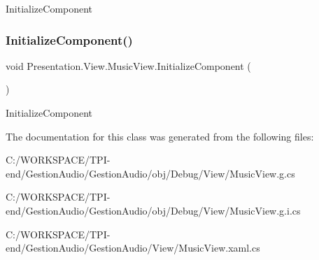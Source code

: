 Initialize\+Component 

\mbox{\label{class_presentation_1_1_view_1_1_music_view_ad544f1791f3fd9b81adde25bbc9a90cf}} 
\subsubsection{\texorpdfstring{Initialize\+Component()}{InitializeComponent()}\hspace{0.1cm}{\footnotesize\ttfamily [4/4]}}
{\footnotesize\ttfamily void Presentation.\+View.\+Music\+View.\+Initialize\+Component (\begin{DoxyParamCaption}{ }\end{DoxyParamCaption})}



Initialize\+Component 



The documentation for this class was generated from the following files\+:\begin{DoxyCompactItemize}
\item 
C\+:/\+W\+O\+R\+K\+S\+P\+A\+C\+E/\+T\+P\+I-\/end/\+Gestion\+Audio/\+Gestion\+Audio/obj/\+Debug/\+View/Music\+View.\+g.\+cs\item 
C\+:/\+W\+O\+R\+K\+S\+P\+A\+C\+E/\+T\+P\+I-\/end/\+Gestion\+Audio/\+Gestion\+Audio/obj/\+Debug/\+View/Music\+View.\+g.\+i.\+cs\item 
C\+:/\+W\+O\+R\+K\+S\+P\+A\+C\+E/\+T\+P\+I-\/end/\+Gestion\+Audio/\+Gestion\+Audio/\+View/Music\+View.\+xaml.\+cs\end{DoxyCompactItemize}
